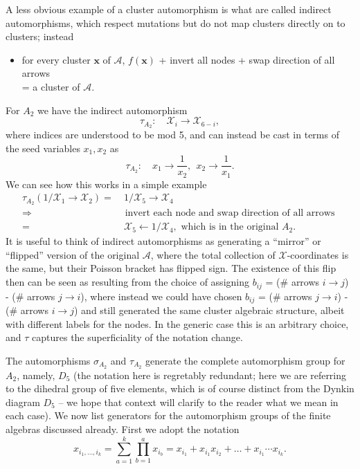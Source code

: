 \documentclass[11pt]{article}
\def\nl{\nonumber\\}
\def\nn{\nonumber}
\def\x{\mathcal{X}}
\def\a{\mathcal{A}}
\begin{document}
A less obvious example of a cluster automorphism is what are called indirect automorphisms, which respect mutations but do not map clusters directly on to clusters; instead
\begin{itemize}
  \item for every cluster $\mathbf{x}$ of $\a$, $f(\mathbf{x})$ + invert all nodes + swap direction of all arrows\\ = a cluster of $\a$.
\end{itemize}
For $A_2$ we have the indirect automorphism
\begin{equation}
  \tau_{A_2}:\quad \mathcal{X}_i \to \mathcal{X}_{6-i},
\end{equation}
where indices are understood to be mod 5, and can instead be cast in terms of the seed variables $x_1, x_2$ as
\begin{equation}
  \tau_{A_2}:\quad x_1 \to \frac{1}{x_2}, ~~x_2 \to \frac{1}{x_1}.
\end{equation}
We can see how this works in a simple example
\begin{align}
  \tau_{A_2}(1/\x_1 \to \x_2) =&~1/\x_5 \to \x_4 \nl
  \Rightarrow &\text{ invert each node and swap direction of all arrows }\\ 
  =&~\x_5 \leftarrow 1/\x_4, \text{ which is in the original $A_2$}.\nn
\end{align}
It is useful to think of indirect automorphisms as generating a ``mirror'' or ``flipped'' version of the original $\a$, where the total collection of $\x$-coordinates is the same, but their Poisson bracket has flipped sign. The existence of this flip then can be seen as resulting from the choice of assigning $b_{ij}$ = (\# arrows $i\to j$) - (\# arrows $j \to i$), where instead we could have chosen $b_{ij}$ = (\# arrows $j \to i$) - (\# arrows $i\to j$) and still generated the same cluster algebraic structure, albeit with different labels for the nodes. In the generic case this is an arbitrary choice, and $\tau$ captures the superficiality of the notation change.

The automorphisms $\sigma_{A_2}$ and $\tau_{A_2}$ generate the complete automorphism group for $A_2$, namely, $D_5$ (the notation here is regretably redundant; here we are referring to the dihedral group of five elements, which is of course distinct from the Dynkin diagram $D_5$ -- we hope that context will clarify to the reader what we mean in each case). We now list generators for the automorphism groups of the finite algebras discussed already. First we adopt the notation
\begin{equation}
	x_{i_1,\ldots, i_k} = \sum_{a=1}^k \prod_{b=1}^a x_{i_b} = x_{i_1}+x_{i_1}x_{i_2} + \ldots + x_{i_1}\cdots x_{i_k}.
\end{equation}
\end{document}
